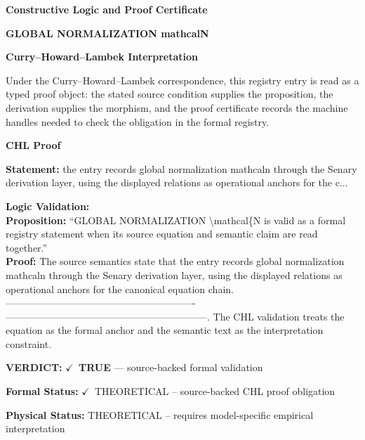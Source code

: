 \clearpage
\begingroup\tzpsupportsetup
\noindent\textbf{\fontsize{10.8pt}{12.8pt}\selectfont [ID 0572] Constructive Logic and Proof Certificate}\par
\noindent\textbf{\fontsize{10pt}{12pt}\selectfont GLOBAL NORMALIZATION mathcalN}\par
\vspace{0.45em}
\begingroup
\footnotesize
\setlength{\parskip}{0.22em}
\setlength{\parindent}{0pt}
\noindent\textbf{Curry--Howard--Lambek Interpretation}\par
Under the Curry--Howard--Lambek correspondence, this registry entry is read as a typed proof
object: the stated source condition supplies the proposition, the derivation supplies the
morphism, and the proof certificate records the machine handles needed to check the obligation
in the formal registry.

\vspace{0.45em}
\noindent\textbf{CHL Proof}\par
\textbf{Statement:} the entry records global normalization mathcaln through the Senary derivation layer,
using the displayed relations as operational anchors for the c...

\textbf{Logic Validation:}\\
\textbf{Proposition:} ``GLOBAL NORMALIZATION \textbackslash{}mathcal\{N is valid as a formal registry statement when its source
equation and semantic claim are read together.''\\
\textbf{Proof:} The source semantics state that the entry records global normalization mathcaln through
the Senary derivation layer, using the displayed relations as operational anchors for
the canonical equation chain. ----------------------------------------------------------
--------------------------------------------------------------. The CHL validation
treats the equation as the formal anchor and the semantic text as the interpretation
constraint.

\textbf{VERDICT:} \ensuremath{\checkmark}\ \textbf{TRUE} --- source-backed formal validation

\textbf{Formal Status:} \ensuremath{\checkmark}\ THEORETICAL -- source-backed CHL proof obligation

\textbf{Physical Status:} THEORETICAL -- requires model-specific empirical interpretation
\par\vspace{0.45em}
\par
\ifTZPDarkEdition
{}
\fi
\endgroup
\endgroup

